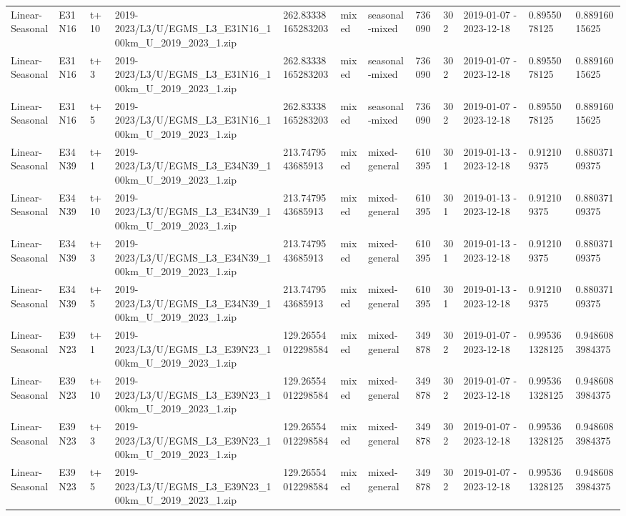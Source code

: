 \begin{landscape}
\begin{longtable}{llllllllllll}
Linear-Seasonal & E31N16 & t+10 & 2019-2023/L3/U/EGMS\_L3\_E31N16\_100km\_U\_2019\_2023\_1.zip & 262.83338165283203 & mixed & seasonal-mixed & 736090 & 302 & 2019-01-07 - 2023-12-18 & 0.8955078125 & 0.88916015625 \\
Linear-Seasonal & E31N16 & t+3 & 2019-2023/L3/U/EGMS\_L3\_E31N16\_100km\_U\_2019\_2023\_1.zip & 262.83338165283203 & mixed & seasonal-mixed & 736090 & 302 & 2019-01-07 - 2023-12-18 & 0.8955078125 & 0.88916015625 \\
Linear-Seasonal & E31N16 & t+5 & 2019-2023/L3/U/EGMS\_L3\_E31N16\_100km\_U\_2019\_2023\_1.zip & 262.83338165283203 & mixed & seasonal-mixed & 736090 & 302 & 2019-01-07 - 2023-12-18 & 0.8955078125 & 0.88916015625 \\
Linear-Seasonal & E34N39 & t+1 & 2019-2023/L3/U/EGMS\_L3\_E34N39\_100km\_U\_2019\_2023\_1.zip & 213.7479543685913 & mixed & mixed-general & 610395 & 301 & 2019-01-13 - 2023-12-18 & 0.912109375 & 0.88037109375 \\
Linear-Seasonal & E34N39 & t+10 & 2019-2023/L3/U/EGMS\_L3\_E34N39\_100km\_U\_2019\_2023\_1.zip & 213.7479543685913 & mixed & mixed-general & 610395 & 301 & 2019-01-13 - 2023-12-18 & 0.912109375 & 0.88037109375 \\
Linear-Seasonal & E34N39 & t+3 & 2019-2023/L3/U/EGMS\_L3\_E34N39\_100km\_U\_2019\_2023\_1.zip & 213.7479543685913 & mixed & mixed-general & 610395 & 301 & 2019-01-13 - 2023-12-18 & 0.912109375 & 0.88037109375 \\
Linear-Seasonal & E34N39 & t+5 & 2019-2023/L3/U/EGMS\_L3\_E34N39\_100km\_U\_2019\_2023\_1.zip & 213.7479543685913 & mixed & mixed-general & 610395 & 301 & 2019-01-13 - 2023-12-18 & 0.912109375 & 0.88037109375 \\
Linear-Seasonal & E39N23 & t+1 & 2019-2023/L3/U/EGMS\_L3\_E39N23\_100km\_U\_2019\_2023\_1.zip & 129.26554012298584 & mixed & mixed-general & 349878 & 302 & 2019-01-07 - 2023-12-18 & 0.995361328125 & 0.9486083984375 \\
Linear-Seasonal & E39N23 & t+10 & 2019-2023/L3/U/EGMS\_L3\_E39N23\_100km\_U\_2019\_2023\_1.zip & 129.26554012298584 & mixed & mixed-general & 349878 & 302 & 2019-01-07 - 2023-12-18 & 0.995361328125 & 0.9486083984375 \\
Linear-Seasonal & E39N23 & t+3 & 2019-2023/L3/U/EGMS\_L3\_E39N23\_100km\_U\_2019\_2023\_1.zip & 129.26554012298584 & mixed & mixed-general & 349878 & 302 & 2019-01-07 - 2023-12-18 & 0.995361328125 & 0.9486083984375 \\
Linear-Seasonal & E39N23 & t+5 & 2019-2023/L3/U/EGMS\_L3\_E39N23\_100km\_U\_2019\_2023\_1.zip & 129.26554012298584 & mixed & mixed-general & 349878 & 302 & 2019-01-07 - 2023-12-18 & 0.995361328125 & 0.9486083984375 \\

\end{longtable}
\end{landscape}
